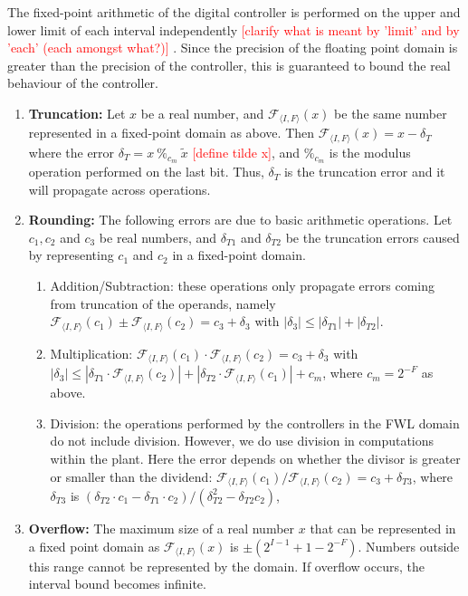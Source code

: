 \documentclass[twocolumn]{autart}    %
\renewcommand{\note}[1]{\textcolor{red}{[#1]}}
\begin{document}
The fixed-point arithmetic of the digital controller is performed on the upper and lower limit of each interval independently \note{clarify what is meant by 'limit' and by 'each' (each amongst what?)} .  
Since the precision of the floating point domain is greater than the precision of the controller, this is guaranteed to bound the real behaviour of the controller. 



\ifx\axelerator


\begin{enumerate}

\item {\bf Truncation:} Let $x$ be a real number, and $\mathcal{F}_{\langle
I,F \rangle}(x)$ be the same number represented in a fixed-point domain as
above.  Then $\mathcal{F}_{\langle I,F \rangle}(x) = x-\delta_T$ where the
error $ \delta_T=x\ \%_{c_m}\ \tilde x$ \note{define tilde x}, and $\%_{c_m}$ is the modulus
operation performed on the last bit. 
Thus, $\delta_T$ is the truncation error and it will propagate across
operations.
%
\item {\bf Rounding:} The following errors are due to basic arithmetic operations.  
Let $c_1, c_2$ and $c_3$ be real numbers, and $\delta_{T1}$ and $\delta_{T2}$ be
the truncation errors caused by representing $c_1$ and $c_2$ in a fixed-point domain.
%
\begin{enumerate}
%
\item Addition/Subtraction: these operations only propagate errors coming
from truncation of the operands, namely $\mathcal{F}_{\langle I,F
\rangle}(c_1) \pm \mathcal{F}_{\langle I,F \rangle}(c_2) = c_3 + \delta_3$
with $|\delta_3| \leq |\delta_{T1}| + |\delta_{T2}|$.
%
\item Multiplication: $\mathcal{F}_{\langle I,F \rangle}(c_1) \cdot
\mathcal{F}_{\langle I,F \rangle}(c_2) =  c_3 + \delta_3$ with $|\delta_3|
\leq |\delta_{T1}\cdot\mathcal{F}_{\langle I,F \rangle}(c_2)|\allowbreak +
|\delta_{T2}\cdot\mathcal{F}_{\langle I,F \rangle}(c_1)| + c_m$, where
$c_m=2^{-F}$ as above.
%
\item Division: the operations performed by the controllers in the FWL
domain do not include division.  However, we do use division in computations within the plant.  
Here the error depends on whether the divisor is greater or smaller than the dividend:  $\mathcal{F}_{\langle I,F
\rangle}(c_1) / \mathcal{F}_{\langle I,F \rangle}(c_2) = c_3 + \delta_{T3}$, 
where $\delta_{T3}$ is $(\delta_{T2}\cdot c_1 - \delta_{T1}\cdot
c_2)/(\delta_{T2}^2 - \delta_{T2} c_2)$,
%
\end{enumerate}

\item {\bf Overflow:}
The maximum size of a real number $x$ that can be represented in a fixed
point domain as $\mathcal{F}_{\langle I,F \rangle}(x)$ is $\pm
(2^{I-1}+1-2^{-F})$.  Numbers outside this range cannot be represented by
the domain.  If overflow occurs, the interval bound becomes infinite.

\end{enumerate}
\end{document}
